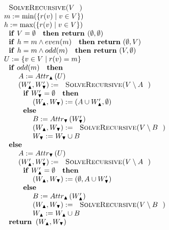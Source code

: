 \begin{equation*}
\begin{array}{l}
\text{\textsc{SolveRecursive(}}V\text{\textsc{)}} \\ 
m:=\min (\{r(v)\mid v\in V\}) \\ 
h:=\max (\{r(v)\mid v\in V\}) \\ 
\text{\textbf{if} }V=\emptyset \text{ \textbf{then return }}(\emptyset
,\emptyset ) \\ 
\text{\textbf{if }}h=m\wedge even(m)\text{ \textbf{then return} }(\emptyset
,V) \\ 
\text{\textbf{if }}h=m\wedge odd(m)\text{ \textbf{then return} }(V,\emptyset
) \\ 
U:=\{v\in V\mid r(v)=m\} \\ 
\text{\textbf{if} }odd(m)\text{ \textbf{then}} \\ 
\qquad A:=Attr_{\blacktriangle }\left( U\right)  \\ 
\qquad \left( W_{\blacktriangle }^{\prime },W_{\blacktriangledown }^{\prime
}\right) :=\text{\textsc{SolveRecursive(}}V\setminus A\text{)} \\ 
\qquad \text{\textbf{if} }W_{\blacktriangledown }^{\prime }=\emptyset \text{ 
\textbf{then}} \\ 
\qquad \qquad \left( W_{\blacktriangle },W_{\blacktriangledown }\right)
:=\left( A\cup W_{\blacktriangle }^{\prime },\emptyset \right)  \\ 
\qquad \text{\textbf{else}} \\ 
\qquad \qquad B:=Attr_{\blacktriangledown }\left( W_{\blacktriangledown
}^{\prime }\right)  \\ 
\qquad \qquad \left( W_{\blacktriangle },W_{\blacktriangledown }\right) :=%
\text{\textsc{SolveRecursive(}}V\setminus B\text{)} \\ 
\qquad \qquad W_{\blacktriangledown }:=W_{\blacktriangledown }\cup B \\ 
\text{\textbf{else}} \\ 
\qquad A:=Attr_{\blacktriangledown }\left( U\right)  \\ 
\qquad \left( W_{\blacktriangle }^{\prime },W_{\blacktriangledown }^{\prime
}\right) :=\text{\textsc{SolveRecursive(}}V\setminus A\text{)} \\ 
\qquad \text{\textbf{if} }W_{\blacktriangle }^{\prime }=\emptyset \text{ 
\textbf{then}} \\ 
\qquad \qquad \left( W_{\blacktriangle },W_{\blacktriangledown }\right)
:=\left( \emptyset ,A\cup W_{\blacktriangledown }^{\prime }\right)  \\ 
\qquad \text{\textbf{else}} \\ 
\qquad \qquad B:=Attr_{\blacktriangle }\left( W_{\blacktriangle }^{\prime
}\right)  \\ 
\qquad \qquad \left( W_{\blacktriangle },W_{\blacktriangledown }\right) :=%
\text{\textsc{SolveRecursive(}}V\setminus B\text{)} \\ 
\qquad \qquad W_{\blacktriangle }:=W_{\blacktriangle }\cup B \\ 
\text{\textbf{return }}\left( W_{\blacktriangle },W_{\blacktriangledown
}\right) 
\end{array}%
\end{equation*}%
